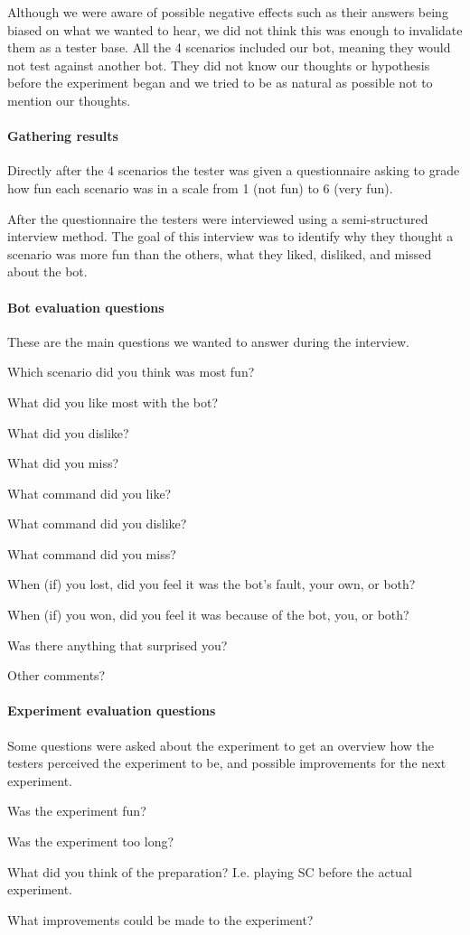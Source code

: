 Although we were aware of possible negative effects such as their answers being biased on what we
wanted to hear, we did not think this was enough to invalidate them as a tester base. All the 4
scenarios included our bot, meaning they would not test against another bot. They did not know our
thoughts or hypothesis before the experiment began and we tried to be as natural as possible not to
mention our thoughts.

\paragraph{Gathering results}
Directly after the 4 scenarios the tester was given a questionnaire asking to grade how fun each
scenario was in a scale from 1 (not fun) to 6 (very fun).

After the questionnaire the testers were interviewed using a semi-structured interview method. The
goal of this interview was to identify why they thought a scenario was more fun than the others,
what they liked, disliked, and missed about the bot.

\paragraph{Bot evaluation questions}
These are the main questions we wanted to answer during the interview.
\begin{compactitem}
	\item Which scenario did you think was most fun?
	\item What did you like most with the bot?
	\item What did you dislike?
	\item What did you miss?
	\item What command did you like?
	\item What command did you dislike?
	\item What command did you miss?
	\item When (if) you lost, did you feel it was the bot's fault, your own, or both?
	\item When (if) you won, did you feel it was because of the bot, you, or both?
	\item Was there anything that surprised you?
	\item Other comments?
\end{compactitem}

\paragraph{Experiment evaluation questions}
Some questions were asked about the experiment to get an overview how the testers perceived the
experiment to be, and possible improvements for the next experiment.
\begin{compactitem}
	\item	Was the experiment fun?
	\item Was the experiment too long?
	\item What did you think of the preparation? I.e. playing SC before the actual experiment.
	\item What improvements could be made to the experiment?
\end{compactitem}
